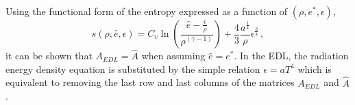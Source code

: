 \documentclass[times,doublespace]{fldauth}%
\begin{document}
Using the functional form of the entropy expressed as a function of $(\rho, e^*, \epsilon)$, 
%
\begin{equation}
s(\rho, \hat{e}, \epsilon) = C_v \ln \left( \frac{\hat{e}-\frac{\epsilon}{\rho}}{\rho^(\gamma-1)} \right) + \frac{4}{3} \frac{a^\frac{1}{4}}{\rho} \epsilon^\frac{3}{4} \, ,
\end{equation}
%
it can be shown that $A_{EDL} = \hat{A}$ when assuming $\hat{e} = e^*$. In the EDL, the radiation energy density equation is substituted by the simple relation $\epsilon = a T^4$ which is equivalent to removing the last row and last columns of the matrices $A_{EDL}$ and $\hat{A}$.
\end{document}
